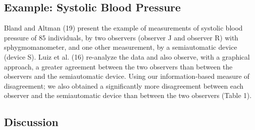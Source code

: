 \documentclass[12pt, a4paper]{report}
\theoremstyle{plain}
\theoremstyle{definition}
\theoremstyle{remark}
\begin{document}
	
	
	\subsection{Example: Systolic Blood Pressure}
	Bland and Altman (19) present the example of measurements of systolic blood pressure of 85 individuals, by two observers (observer J and observer R) with sphygmomanometer, and one other measurement, by a semiautomatic device (device S). Luiz et al. (16) re-analyze the data and also observe, with a graphical approach, a greater agreement between the two observers than between the observers and the semiautomatic device. Using our information-based measure of disagreement; we also obtained a significantly more
	disagreement between each observer and the semiautomatic device than between the two observers (Table 1).
	
	
	\subsection{Discussion}
	
\end{document}
